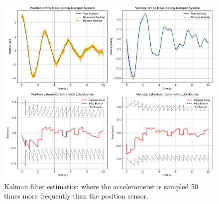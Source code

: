 \begin{figure}[H]
    \centering
    \includegraphics[width=1\textwidth]{figures/kf_freq_50.pdf}
    \caption{Kalman filter estimation where the accelerometer is sampled 50 times more frequently than the position sensor.}
    \label{fig:kf_freq_50}
\end{figure}

